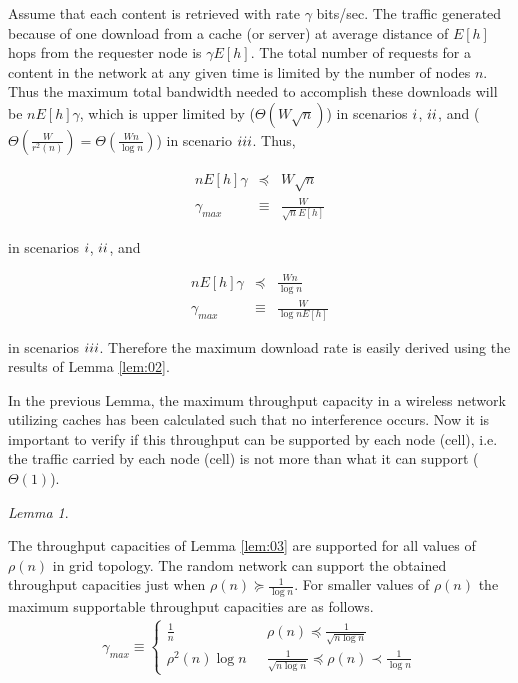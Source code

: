 \documentclass[journal]{IEEEtran}
\theoremstyle{plain}
\theoremstyle{remark}
\newtheorem{lemma}{Lemma}
\begin{document}
\begin{IEEEproof}
Assume that each content is retrieved with rate $\gamma$ bits/sec. The traffic generated because of one download from a cache (or server) at average distance of $E[h]$ hops from the requester node is $\gamma E[h]$. The total number of requests for a content in the network at any given time is limited by the number of nodes $n$. Thus the maximum total bandwidth needed to accomplish these downloads will be $nE[h]\gamma$, which is upper limited by ($\Theta(W\sqrt{n})$) in scenarios $\romannumeral 1$, $\romannumeral 2$, and ($\Theta(\frac{W}{r^2(n)})=\Theta(\frac{Wn}{\log n})$) in scenario $\romannumeral 3$. Thus,

\begin{eqnarray}
nE[h]\gamma &\preceq&  W\sqrt{n} \nonumber \\
\gamma_{max} &\equiv& \frac{W}{\sqrt{n}E[h]} 
\end{eqnarray}

in scenarios $\romannumeral 1$, $\romannumeral 2$, and

\begin{eqnarray}
nE[h]\gamma &\preceq&  \frac{Wn}{\log n} \nonumber \\
\gamma_{max} &\equiv& \frac{W}{\log nE[h]} 
\end{eqnarray}

in scenarios $\romannumeral 3$. Therefore the maximum download rate is easily derived using the results of Lemma \ref{lem:02}.
\end{IEEEproof}

In the previous Lemma, the maximum throughput capacity in a wireless network utilizing caches has been calculated such that no interference occurs. Now it is important to verify if this throughput can be supported by each node (cell), i.e. the traffic carried by each node (cell) is not more than what it can support ($\Theta(1)$).

\begin{lemma} \label{lem:04}

	The throughput capacities of Lemma \ref{lem:03} are supported for all values of $\rho(n)$ in grid topology. The random network can support the obtained throughput capacities just when $\rho(n) \succeq \frac{1}{\log n}$. For smaller values of $\rho(n)$ the maximum supportable throughput capacities are as follows.
	\begin{eqnarray}
	\gamma_{max} \equiv \left\{\begin{array}{ll}
					\frac{1}{n}& \ \ \  \rho(n)\preceq \frac{1}{\sqrt{n\log n}} \\
					\rho^2(n)\log n& \ \ \  \frac{1}{\sqrt{n\log n}} \preceq \rho(n)\prec \frac{1}{\log n} 
			\end{array}\right . 
	\end{eqnarray}
\end{lemma}
\end{document}
